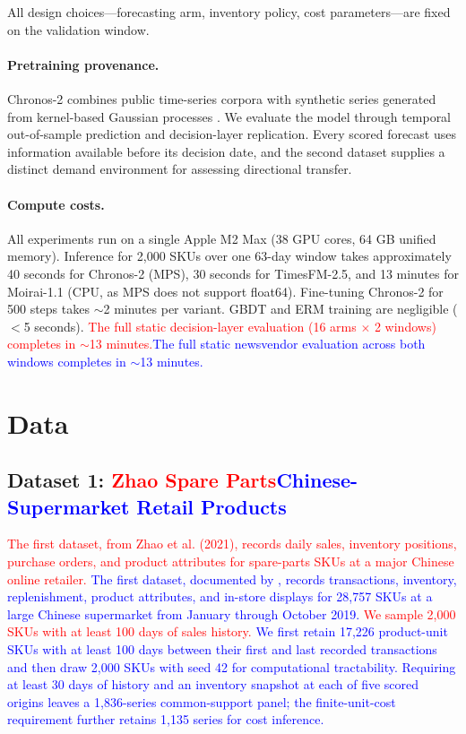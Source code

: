 \documentclass[msom,dblanonrev]{informs4}
\newcommand{\add}[1]{\textcolor{blue}{#1}}
\newcommand{\reduce}[1]{\textcolor{red}{#1}\hspace{0.5em}}
\begin{document}
All design choices---forecasting arm, inventory policy, cost parameters---are fixed on the validation window.

\paragraph{Pretraining provenance.}
Chronos-2 combines public time-series corpora with synthetic series generated from kernel-based Gaussian processes \citep{Ansari2024Chronos}.
We evaluate the model through temporal out-of-sample prediction and decision-layer replication.
Every scored forecast uses information available before its decision date, and the second dataset supplies a distinct demand environment for assessing directional transfer.

\paragraph{Compute costs.}
All experiments run on a single Apple M2 Max (38 GPU cores, 64 GB unified memory).
Inference for 2{,}000 SKUs over one 63-day window takes approximately 40 seconds for Chronos-2 (MPS), 30 seconds for TimesFM-2.5, and 13 minutes for Moirai-1.1 (CPU, as MPS does not support float64).
Fine-tuning Chronos-2 for 500 steps takes $\sim$2 minutes per variant.
GBDT and ERM training are negligible ($<$5 seconds).
\reduce{The full static decision-layer evaluation (16 arms $\times$ 2 windows) completes in $\sim$13 minutes.}\add{The full static newsvendor evaluation across both windows completes in $\sim$13 minutes.}


\section{Data}\label{sec:data}

\subsection{Dataset 1: \reduce{Zhao Spare Parts}\add{Chinese-Supermarket Retail Products}}

\reduce{The first dataset, from Zhao et al. (2021), records daily sales, inventory positions, purchase orders, and product attributes for spare-parts SKUs at a major Chinese online retailer.}
\add{The first dataset, documented by \citet{ZhaoEtAl2020}, records transactions, inventory, replenishment, product attributes, and in-store displays for 28{,}757 SKUs at a large Chinese supermarket from January through October 2019.}
\reduce{We sample 2{,}000 SKUs with at least 100 days of sales history.}
\add{We first retain 17{,}226 product-unit SKUs with at least 100 days between their first and last recorded transactions and then draw 2{,}000 SKUs with seed 42 for computational tractability. Requiring at least 30 days of history and an inventory snapshot at each of five scored origins leaves a 1{,}836-series common-support panel; the finite-unit-cost requirement further retains 1{,}135 series for cost inference.}
\end{document}
